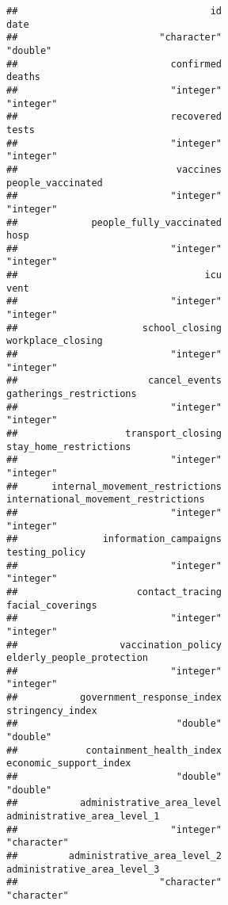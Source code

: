 \documentclass[
]{book}
\begin{document}
\begin{verbatim}
##                                  id                                date 
##                         "character"                            "double" 
##                           confirmed                              deaths 
##                           "integer"                           "integer" 
##                           recovered                               tests 
##                           "integer"                           "integer" 
##                            vaccines                   people_vaccinated 
##                           "integer"                           "integer" 
##             people_fully_vaccinated                                hosp 
##                           "integer"                           "integer" 
##                                 icu                                vent 
##                           "integer"                           "integer" 
##                      school_closing                   workplace_closing 
##                           "integer"                           "integer" 
##                       cancel_events             gatherings_restrictions 
##                           "integer"                           "integer" 
##                   transport_closing              stay_home_restrictions 
##                           "integer"                           "integer" 
##      internal_movement_restrictions international_movement_restrictions 
##                           "integer"                           "integer" 
##               information_campaigns                      testing_policy 
##                           "integer"                           "integer" 
##                     contact_tracing                    facial_coverings 
##                           "integer"                           "integer" 
##                  vaccination_policy           elderly_people_protection 
##                           "integer"                           "integer" 
##           government_response_index                    stringency_index 
##                            "double"                            "double" 
##            containment_health_index              economic_support_index 
##                            "double"                            "double" 
##           administrative_area_level         administrative_area_level_1 
##                           "integer"                         "character" 
##         administrative_area_level_2         administrative_area_level_3 
##                         "character"                         "character" 

\end{verbatim}
\end{document}
